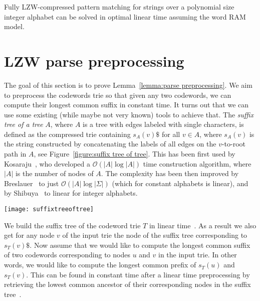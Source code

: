 \documentclass[runningheads]{llncs}
\begin{document}
\begin{theorem}
Fully LZW-compressed pattern matching for strings over a polynomial size integer alphabet can be solved in optimal linear time assuming the word RAM model.
\end{theorem}

\section{LZW parse preprocessing}
\label{section:lzw parse}

The goal of this section is to prove Lemma~\ref{lemma:parse preprocessing}. We aim to preprocess the codewords trie so that
given any two codewords, we can compute their longest common suffix in constant time. It turns out that we can use some
existing (while maybe not very known) tools to achieve that. The \emph{suffix tree of a tree} $A$, where $A$ is a tree with edges
labeled with single characters, is defined as the compressed trie containing $s_A(v)\$$ for all $v\in A$, where $s_A(v)$ is the string
constructed by concatenating the labels of all edges on the $v$-to-root path in $A$, see Figure~\ref{figure:suffix tree of tree}. This has been
first used by Kosaraju~\cite{KosarajuTree}, who developed a $\mathcal{O}(|A|\log |A|)$ time construction algorithm, where $|A|$ is the number
of nodes of $A$. The complexity has been then improved by Breslauer~\cite{BreslauerTree} to just $\mathcal{O}(|A|\log|\Sigma|)$ (which for constant 
alphabets is linear), and by Shibuya~\cite{ShibuyaTree} to linear for integer alphabets.

\begin{figure*}
\centering
\texttt{[image: suffixtreeoftree]}
\caption{A trie (on the left) and its suffix tree (on the right).}
\label{figure:suffix tree of tree}
\end{figure*}

We build the suffix tree of the codeword trie $T$ in linear time~\cite{ShibuyaTree}. As a result we also get for any node $v$ of the input trie the node of the suffix tree corresponding to $s_T(v)\$$. Now assume that we would like to compute the longest common suffix of two codewords corresponding to
nodes $u$ and $v$ in the input trie. In other words, we would like to compute the longest common prefix of $s_T(u)$ and $s_T(v)$. This can be found
in constant time after a linear time preprocessing by retrieving the lowest common ancestor of their corresponding nodes in the suffix tree~\cite{BenderLCA}. 





\end{document}
